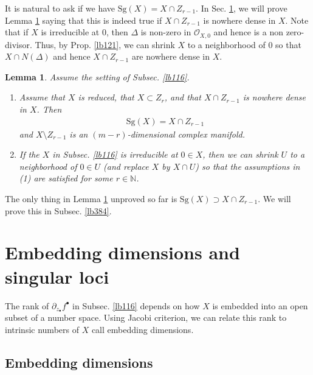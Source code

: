 \documentclass[12pt,b5paper,notitlepage]{report}
\theoremstyle{definition}
\theoremstyle{plain}
\newtheorem{lm}[df]{Lemma}
\newcommand{\scr}{\mathscr}
\newcommand{\blt}{\bullet}
\newcommand{\Nbb}{\mathbb N}
\newcommand{\Sg}{\mathrm{Sg}}
\numberwithin{equation}{section}
\begin{document}
It is natural to ask if we have $\Sg(X)= X\cap Z_{r-1}$. In Sec. \ref{lb131}, we will prove Lemma \ref{lb132} saying that this is indeed true if $X\cap Z_{r-1}$ is nowhere dense in $X$. Note that if $X$ is irreducible at $0$, then $\varDelta$ is non-zero in $\scr O_{X,0}$ and hence is a non zero-divisor. Thus, by Prop. \ref{lb121}, we can shrink $X$ to a neighborhood of $0$ so that $X\cap N(\varDelta)$ and hence $X\cap Z_{r-1}$ are nowhere dense in $X$.

\begin{lm}\label{lb132}
Assume the setting of Subsec. \ref{lb116}.
\begin{enumerate}[label=(\arabic*)]
\item Assume that $X$ is reduced, that $X\subset Z_r$, and that $X\cap Z_{r-1}$ is nowhere dense in $X$. Then
\begin{align}
\Sg(X)=X\cap Z_{r-1}
\end{align}
and $X\setminus Z_{r-1}$ is an $(m-r)$-dimensional complex manifold.
\item If the $X$ in Subsec. \ref{lb116} is irreducible at $0\in X$, then we can shrink $U$ to a neighborhood of $0\in U$ (and replace $X$ by $X\cap U$) so that the assumptions in (1) are satisfied for some $r\in\Nbb$.
\end{enumerate}
\end{lm}

The only thing in Lemma \ref{lb132} unproved so far is $\Sg(X)\supset X\cap Z_{r-1}$. We will prove this in Subsec. \ref{lb384}. 


















\section{Embedding dimensions and singular loci}\label{lb131}



The rank of $\partial_{z_\blt}f^\blt$ in Subsec. \ref{lb116} depends on how $X$ is embedded into an open subset of a number space. Using Jacobi criterion, we can relate this rank to intrinsic numbers of $X$ call embedding dimensions. 

\subsection{Embedding dimensions}
\end{document}
